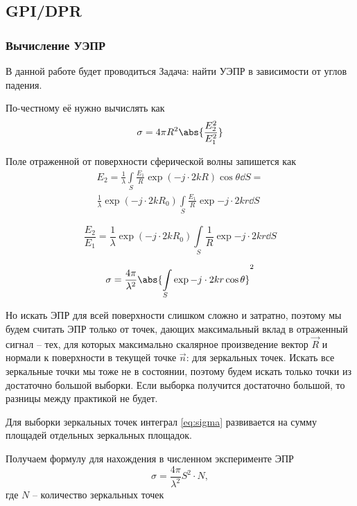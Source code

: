 \subsection*{GPI/DPR}%
\label{sub:GPI/DPR}


\subsubsection*{Вычисление УЭПР}%

В данной работе будет проводиться 
Задача: найти УЭПР в зависимости от углов падения.

По-честному её нужно вычислять как 
\begin{equation}
    \sigma = 4 \pi R^2 \abs{\frac{E_2^2}{E_1^2}}
\end{equation}

Поле отраженной от поверхности сферической волны запишется как
\begin{multline}
    E_2 = \frac{1}{\lambda} \int\limits_{S} \frac{E_1}{R} \exp(-j \cdot 2 k R)
    \cos \theta \dd S = \\
    \frac{1}{\lambda} \exp(-j\cdot 2k R_0) \int\limits_{S} \frac{E_1}{R} \exp{-j \cdot 2 kr} \dd S
\end{multline}

\begin{equation}
    \frac{E_2}{E_1} = \frac{1}{\lambda} \exp(-j \cdot 2k R_0)
    \int\limits_{S} \frac{1}{R} \exp{-j \cdot 2 k r } \dd S
\end{equation}

\begin{equation}
    \label{eq:sigma}
    \sigma = \frac{4 \pi}{\lambda^2} \abs{\int\limits_{S}^{} \exp{-j \cdot 2 k
        r } \cos \theta }^2
\end{equation}

Но искать ЭПР для всей поверхности слишком сложно и затратно, поэтому мы будем
считать ЭПР только от точек, дающих максимальный вклад в отраженный сигнал --
тех, для которых максимально скалярное произведение вектор $\vec R$ и нормали к
поверхности в текущей точке  $\vec n$: для зеркальных точек. Искать все
зеркальные точки мы тоже не в состоянии, поэтому будем искать только точки из
достаточно большой выборки. Если выборка получится достаточно большой, то
разницы между практикой не будет.

Для выборки зеркальных точек  интеграл  \eqref{eq:sigma} развивается на сумму
площадей отдельных зеркальных площадок. 

Получаем формулу для нахождения в численном эксперименте ЭПР
\begin{equation}
    \sigma = \frac{4 \pi}{\lambda^2} S^2 \cdot  N, 
\end{equation}
где $N$ -- количество зеркальных точек


